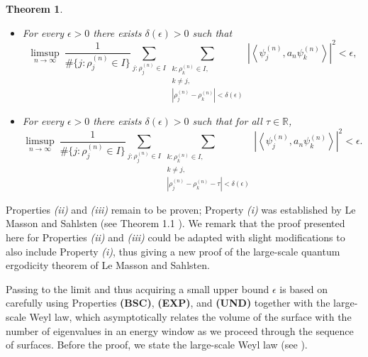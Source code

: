 \documentclass[11pt,twoside,reqno]{amsart} \usepackage{a4wide} \usepackage[T1]{fontenc} \usepackage[utf8]{inputenc} \usepackage{soul}  \usepackage{amsmath} \usepackage{amsfonts} \usepackage{amssymb} \usepackage{mathtools} \usepackage{amsthm} \usepackage{xcolor} \usepackage{graphicx} \usepackage{hyperref} \usepackage{standalone} \usepackage{esint} \usepackage{comment} \usepackage[left=2.3cm,top=3cm,right=2.3cm]{geometry} \usepackage{bm} \usepackage{svg} \usepackage{float} \numberwithin{equation}{section} \theoremstyle{plain} \newtheorem{thm}{Theorem}[section] \newtheorem{theorem}[thm]{Theorem} \newtheorem*{theorem*}{Theorem}\newtheorem{conj}[thm]{Conjecture} \newtheorem{lemma}[thm]{Lemma} \newtheorem{prop}[thm]{Proposition} \newtheorem{proposition}[thm]{Proposition} \newtheorem{cor}[thm]{Corollary} \newtheorem{question}[thm]{Question} \newtheorem{corollary}[thm]{Corollary} \newtheorem{assumption}[thm]{Assumption} \theoremstyle{definition} \newtheorem{defn}[thm]{Definition} \newtheorem{choice}[thm]{Choice} \newtheorem{definition}[thm]{Definition} \newtheorem{ex}[thm]{Example} \newtheorem{notation}[thm]{Notation} \newtheorem*{ack}{Acknowledgements} \theoremstyle{remark} \newtheorem{remark}[thm]{Remark} \newtheorem{bigremark}[thm]{Remark} \usepackage{xcolor} \newcommand{\red}[1]{ {\color{Red}#1} } \newcommand{\blue}[1]{ {\color{Blue}#1} } \author{Kai Hippi} \address{Aalto University, Espoo, Finland} \email{kai.hippi@aalto.fi}
\begin{document}
\begin{theorem*}
\begin{itemize}
    \item[(ii)] 
    For every \( \epsilon > 0 \) there exists \( \delta(\epsilon) > 0 \) such that
    \[
        \limsup_{n \to \infty} \
        \frac{1}{ \# \{ j  :  \rho_{j}^{( n )} \in I \} }
        \sum_{j : \rho_{j}^{(n)} \in I}
        \sum_{\substack{k: \rho_{k}^{( n )} \in I, \\ k \neq j, \\ | \rho_{j}^{(n)} - \rho_{k}^{(n)} | < \delta( \epsilon )}}
        \left| \left\langle \psi_{j}^{(n)}, a_{n} \psi_{k}^{(n)} \right\rangle \right|^{2}
        < \epsilon,
    \]
    \item[(iii)]
    For every \( \epsilon > 0 \) there exists \( \delta(\epsilon) > 0 \) such that for all \( \tau \in \mathbb{R} \),
    \[
        \limsup_{n \to \infty} \
        \frac{1}{ \# \{  j : \rho_{j}^{( n )} \in I \} }
        \sum_{j: \rho_{j}^{(n)} \in I}
        \sum_{\substack{k : \rho_{k}^{( n )} \in I, \\ k \neq j , \\ | \rho_{j}^{(n)} - \rho_{k}^{(n)} - \tau | < \delta( \epsilon )}}
        \left| \left\langle \psi_{j}^{(n)}, a_{n} \psi_{k}^{(n)} \right\rangle \right|^{2}
        < \epsilon.
    \]
\end{itemize}

\end{theorem*}


Properties \emph{(ii)} and \emph{(iii)} remain to be proven; Property \emph{(i)} was established by Le Masson and Sahlsten (see Theorem 1.1 \cite{LS17}). We remark that the proof presented here for Properties \emph{(ii)} and \emph{(iii)} could be adapted with slight modifications to also include Property \emph{(i)}, thus giving a new proof of the large-scale quantum ergodicity theorem of Le Masson and Sahlsten. 

Passing to the limit and thus acquiring a small upper bound $ \epsilon $ is based on carefully using Properties \textbf{(BSC)}, \textbf{(EXP)}, and \textbf{(UND)} together with the large-scale Weyl law, which asymptotically relates the volume of the surface with the number of eigenvalues in an energy window as we proceed through the sequence of surfaces. Before the proof, we state the large-scale Weyl law (see \cite[Sec.9]{LS17}). 
\end{document}
